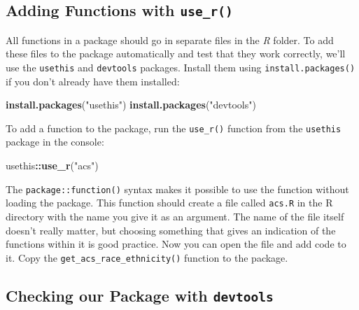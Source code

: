 \documentclass[
]{book}
\newenvironment{Shaded}{\begin{snugshade}}{\end{snugshade}}
\newcommand{\FunctionTok}[1]{\textcolor[rgb]{0.13,0.29,0.53}{\textbf{#1}}}
\newcommand{\NormalTok}[1]{#1}
\newcommand{\SpecialCharTok}[1]{\textcolor[rgb]{0.81,0.36,0.00}{\textbf{#1}}}
\newcommand{\StringTok}[1]{\textcolor[rgb]{0.31,0.60,0.02}{#1}}
\begin{document}
\hypertarget{adding-functions-with-use_r}{%
\subsection*{\texorpdfstring{Adding Functions with \texttt{use\_r()}}{Adding Functions with use\_r()}}\label{adding-functions-with-use_r}}

All functions in a package should go in separate files in the \emph{R} folder. To add these files to the package automatically and test that they work correctly, we'll use the \texttt{usethis} and \texttt{devtools} packages. Install them using \texttt{install.packages()} if you don't already have them installed:

\begin{Shaded}
\begin{Highlighting}[]
\FunctionTok{install.packages}\NormalTok{(}\StringTok{"usethis"}\NormalTok{)}
\FunctionTok{install.packages}\NormalTok{(}\StringTok{"devtools"}\NormalTok{)}
\end{Highlighting}
\end{Shaded}

To add a function to the package, run the \texttt{use\_r()} function from the \texttt{usethis} package in the console:

\begin{Shaded}
\begin{Highlighting}[]
\NormalTok{usethis}\SpecialCharTok{::}\FunctionTok{use\_r}\NormalTok{(}\StringTok{"acs"}\NormalTok{)}
\end{Highlighting}
\end{Shaded}

The \texttt{package::function()} syntax makes it possible to use the function without loading the package. This function should create a file called \texttt{acs.R} in the R directory with the name you give it as an argument. The name of the file itself doesn't really matter, but choosing something that gives an indication of the functions within it is good practice. Now you can open the file and add code to it. Copy the \texttt{get\_acs\_race\_ethnicity()} function to the package.

\hypertarget{checking-our-package-with-devtools}{%
\subsection*{\texorpdfstring{Checking our Package with \texttt{devtools}}{Checking our Package with devtools}}\label{checking-our-package-with-devtools}}
\end{document}
